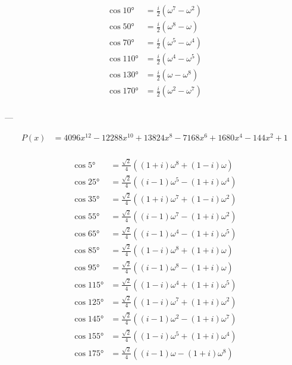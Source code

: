 $$
\begin{aligned}
    \cos 10°  &= \frac{i}{2} \left(ω^7-ω^2\right)\\
    \cos 50°  &= \frac{i}{2} \left(ω^8-ω  \right)\\
    \cos 70°  &= \frac{i}{2} \left(ω^5-ω^4\right)\\
    \cos 110° &= \frac{i}{2} \left(ω^4-ω^5\right)\\
    \cos 130° &= \frac{i}{2} \left(ω  -ω^8\right)\\
    \cos 170° &= \frac{i}{2} \left(ω^2-ω^7\right)\\
\end{aligned}
$$

---

$$
\begin{aligned}
    P(x) &= 4096 x^{12}-12288 x^{10}+13824 x^8-7168 x^6+1680 x^4-144 x^2+1\\
\end{aligned}
$$

$$
\begin{aligned}
    \cos 5°   &= \frac{\sqrt{2}}{4} \left((1+i)ω^8+(1-i)ω  \right)\\
    \cos 25°  &= \frac{\sqrt{2}}{4} \left((i-1)ω^5-(1+i)ω^4\right)\\
    \cos 35°  &= \frac{\sqrt{2}}{4} \left((1+i)ω^7+(1-i)ω^2\right)\\
    \cos 55°  &= \frac{\sqrt{2}}{4} \left((i-1)ω^7-(1+i)ω^2\right)\\
    \cos 65°  &= \frac{\sqrt{2}}{4} \left((i-1)ω^4-(1+i)ω^5\right)\\
    \cos 85°  &= \frac{\sqrt{2}}{4} \left((1-i)ω^8+(1+i)ω  \right)\\
    \cos 95°  &= \frac{\sqrt{2}}{4} \left((i-1)ω^8-(1+i)ω  \right)\\
    \cos 115° &= \frac{\sqrt{2}}{4} \left((1-i)ω^4+(1+i)ω^5\right)\\
    \cos 125° &= \frac{\sqrt{2}}{4} \left((1-i)ω^7+(1+i)ω^2\right)\\
    \cos 145° &= \frac{\sqrt{2}}{4} \left((i-1)ω^2-(1+i)ω^7\right)\\
    \cos 155° &= \frac{\sqrt{2}}{4} \left((1-i)ω^5+(1+i)ω^4\right)\\
    \cos 175° &= \frac{\sqrt{2}}{4} \left((i-1)ω  -(1+i)ω^8\right)\\
\end{aligned}
$$
